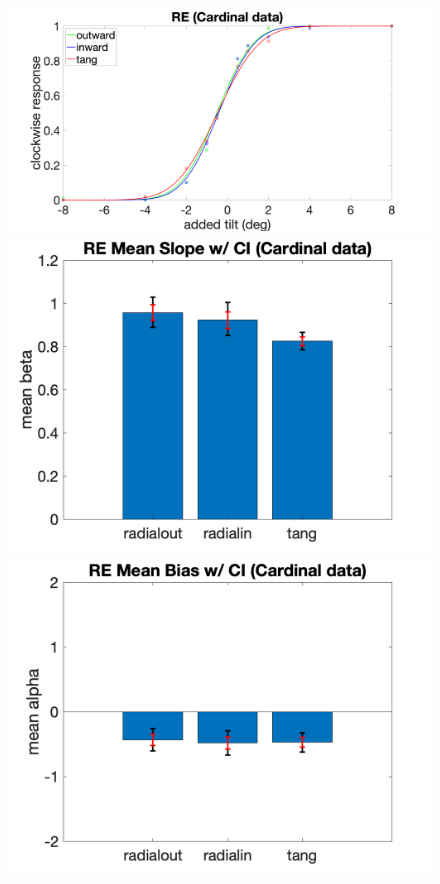 \documentclass[11pt]{article} %
\begin{document}
\begin{figure}[H]
\includegraphics[scale=.06]{Images/PF_RE_cardinal.png}
\includegraphics[scale=.11]{Images/MeanSlopeError_ci_RE_cardinal.png}
\includegraphics[scale=.11]{Images/MeanBiasError_ci_RE_cardinal.png}

\end{figure}
\end{document}
